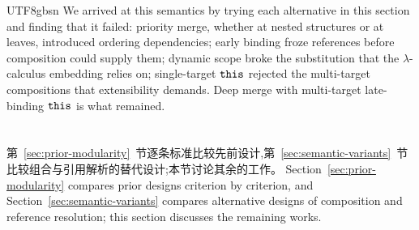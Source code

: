 \begin{CJK*}{UTF8}{gbsn}
We arrived at this semantics by trying each alternative in this section
and finding that it failed:
priority merge, whether at nested structures or at leaves,
introduced ordering dependencies;
early binding froze references before composition could
supply them;
dynamic scope broke the substitution that the
$\lambda$-calculus embedding relies on;
single-target $\mathtt{this}$ rejected the multi-target compositions
that extensibility demands.
Deep merge with multi-target late-binding $\mathtt{this}$ is what
remained.
\fi

\section{}
\label{sec:related-work}

\ifPaperChinese
第~\ref{sec:prior-modularity}~节逐条标准比较先前设计,第~\ref{sec:semantic-variants}~节比较组合与引用解析的替代设计;本节讨论其余的工作。
\else
Section~\ref{sec:prior-modularity} compares prior designs criterion by criterion, and
Section~\ref{sec:semantic-variants} compares alternative designs of composition and reference
resolution; this section discusses the remaining works.
\fi


\end{CJK*}
